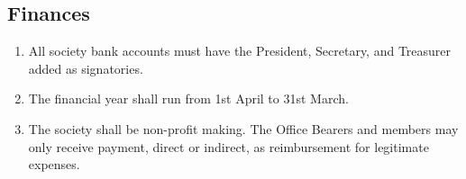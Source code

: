 \subsection{Finances}

\begin{enumerate}
    \item All society bank accounts must have the President, Secretary, and Treasurer added as signatories.

    \item The financial year shall run from 1st April to 31st March.
    
    \item The society shall be non-profit making. The Office Bearers and members may only receive payment, direct or indirect, as reimbursement for legitimate expenses.
    
\end{enumerate}

